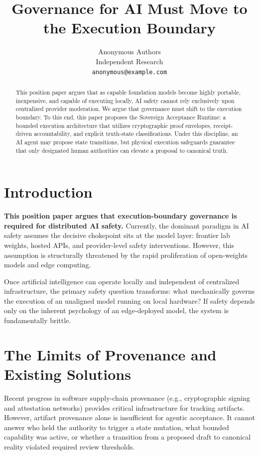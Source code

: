 \documentclass{article}
\title{Governance for AI Must Move to the Execution Boundary}
\author{
  Anonymous Authors \\
  Independent Research \\
  \texttt{anonymous@example.com} \\
}
\begin{document}
\maketitle

\begin{abstract}
This position paper argues that as capable foundation models become highly portable, inexpensive, and capable of executing locally, AI safety cannot rely exclusively upon centralized provider moderation. We argue that governance must shift to the execution boundary. To this end, this paper proposes the Sovereign Acceptance Runtime: a bounded execution architecture that utilizes cryptographic proof envelopes, receipt-driven accountability, and explicit truth-state classifications. Under this discipline, an AI agent may propose state transitions, but physical execution safeguards guarantee that only designated human authorities can elevate a proposal to canonical truth.
\end{abstract}

\section{Introduction}

\textbf{This position paper argues that execution-boundary governance is required for distributed AI safety.} Currently, the dominant paradigm in AI safety assumes the decisive chokepoint sits at the model layer: frontier lab weights, hosted APIs, and provider-level safety interventions. However, this assumption is structurally threatened by the rapid proliferation of open-weights models and edge computing.

Once artificial intelligence can operate locally and independent of centralized infrastructure, the primary safety question transforms: what mechanically governs the execution of an unaligned model running on local hardware? If safety depends only on the inherent psychology of an edge-deployed model, the system is fundamentally brittle.

\section{The Limits of Provenance and Existing Solutions}
Recent progress in software supply-chain provenance (e.g., cryptographic signing and attestation networks) provides critical infrastructure for tracking artifacts. However, artifact provenance alone is insufficient for agentic acceptance. It cannot answer who held the authority to trigger a state mutation, what bounded capability was active, or whether a transition from a proposed draft to canonical reality violated required review thresholds. 
\end{document}
